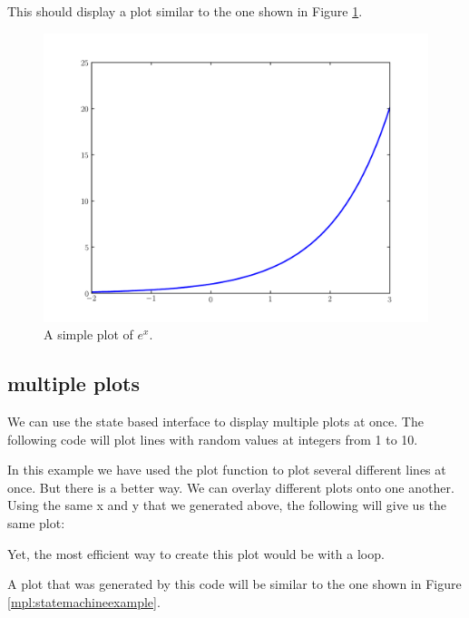 This should display a plot similar to the one shown in Figure
\ref{mpl:explot}.

\begin{figure}
\includegraphics[width=\textwidth]{explot.pdf}
\caption{A simple plot of $e^x$.} 
\label{mpl:explot} 
\end{figure}

\subsection*{multiple plots}
We can use the state based interface to display multiple plots at once. 
The following code will plot lines with random values at integers from 1 to 10. 



In this example we have used the plot function to plot several different
lines at once. But there is a better way. We can overlay different plots onto 
one another. Using the same x and y that we generated above, the following will give
us the same plot:



Yet, the most efficient way to create this plot would be with a loop.



A plot that was generated by this code will be similar to the one shown
in Figure \ref{mpl:statemachineexample}.

